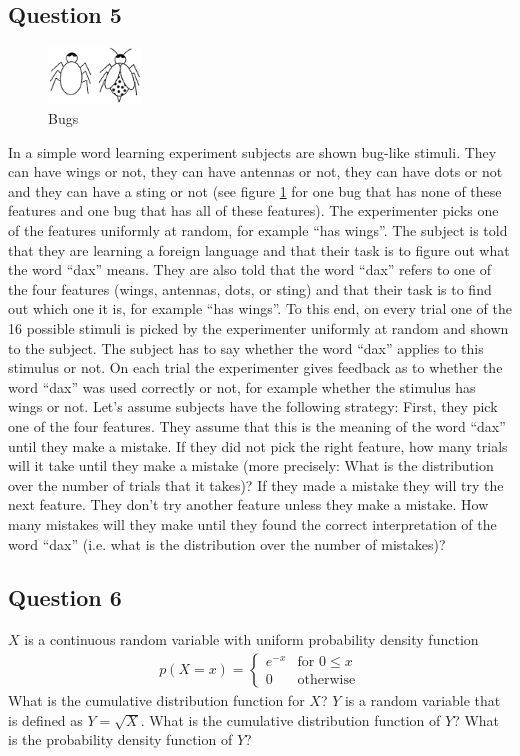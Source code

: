 \documentclass[../main/Notes.tex]{subfiles}
\begin{document}
\subsection*{Question 5}
\begin{figure}[b]
  \centering
  \includegraphics[width=2.5cm]{../images/bugs.jpg}
  \caption{Bugs}
  \label{fig:midterm_bugpic}
\end{figure}
In a simple word learning experiment subjects are shown bug-like stimuli. They can have wings or not, they can have antennas or not, they can have dots or not and they can have a sting or not (see figure \ref{fig:midterm_bugpic} for one bug that has none of these features and one bug that has all of these features). The experimenter picks one of the features uniformly at random, for example ``has wings''. The subject is told that they are learning a foreign language and that their task is to figure out what the word ``dax'' means. They are also told that the word ``dax'' refers to one of the four features (wings, antennas, dots, or sting) and that their task is to find out which one it is, for example ``has wings''. To this end, on every trial one of the 16 possible stimuli is picked by the experimenter uniformly at random and shown to the subject. The subject has to say whether the word ``dax'' applies to this stimulus or not. On each trial the experimenter gives feedback as to whether the word ``dax'' was used correctly or not, for example whether the stimulus has wings or not. Let's assume subjects have the following strategy: First, they pick one of the four features. They assume that this is the meaning of the word ``dax'' until they make a mistake. If they did not pick the right feature, how many trials will it take until they make a mistake (more precisely: What is the distribution over the number of trials that it takes)? If they made a mistake they will try the next feature. They don't try another feature unless they make a mistake. How many mistakes will they make until they found the correct interpretation of the word ``dax'' (i.e. what is the distribution over the number of mistakes)?

\subsection*{Question 6}
$X$ is a continuous random variable with uniform probability density function
\begin{align*}
p(X=x)=\begin{cases}
e^{-x} &\text{for } 0 \leq x \\
0 & \text{otherwise}
\end{cases}
\end{align*}
What is the cumulative distribution function for $X$? $Y$ is a random variable that is defined as $Y=\sqrt{X}$. What is the cumulative distribution function of $Y$? What is the probability density function of $Y$?
\end{document}
